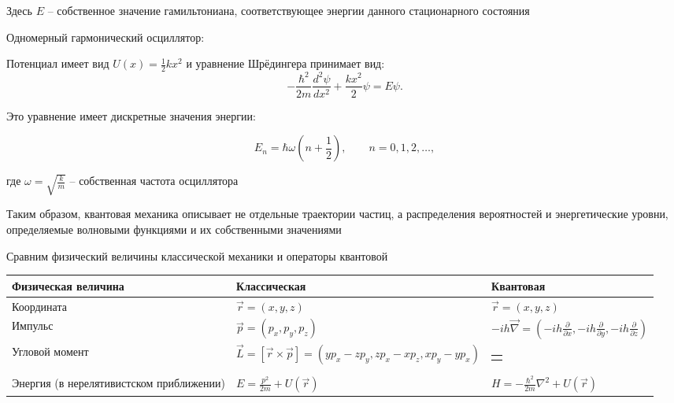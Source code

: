 \documentclass[12pt]{article}
\begin{document}
Здесь $E$ -- собственное значение гамильтониана, соответствующее энергии данного стационарного состояния

\mediumvspace

\Ex Одномерный гармонический осциллятор:

Потенциал имеет вид $U(x) = \frac{1}{2}kx^2$ и уравнение Шрёдингера принимает вид:
\[
-\frac{\hbar^2}{2m}\frac{d^2\psi}{dx^2} + \frac{kx^2}{2}\psi = E\psi.
\]

Это уравнение имеет дискретные значения энергии:

\[
E_n = \hbar\omega\left(n + \frac{1}{2}\right), \qquad n = 0, 1, 2, \ldots,
\]

где $\omega = \sqrt{\frac{k}{m}}$ -- собственная частота осциллятора

\mediumvspace

Таким образом, квантовая механика описывает не отдельные траектории частиц, а распределения вероятностей и энергетические уровни, определяемые волновыми функциями и их собственными значениями

Сравним физический величины классической механики и операторы квантовой
\begin{center}
    \begin{tabularx}{\textwidth}{p{}|X|X}
        Физическая величина & Классическая & Квантовая \\
        \hline
        Координата & $\vec r = (x, y, z)$ & $\vec r = (x, y, z)$ \\
        \hline
        Импульс & $\vec p = (p_x, p_y, p_z)$ & $-ih \vec \nabla = \left(-ih \frac{\partial}{\partial x}, -ih \frac{\partial}{\partial y}, -ih \frac{\partial}{\partial z}\right)$ \\
        \hline
        Угловой момент & $\vec L = [\vec r \times \vec p] = (y p_x - z p_y, z p_x - x p_z, x p_y - y p_x)$ & 
        \begin{tabular}{@{}c@{}}$
        \hat{\vec L} = -i\hbar [\vec r \times \vec{\nabla}] = \\[3pt]
        \biggl(
          -i\hbar\!\left(y \frac{\partial}{\partial z} - z \frac{\partial}{\partial y}\right), \\[3pt]
          -i\hbar\!\left(z \frac{\partial}{\partial x} - x \frac{\partial}{\partial z}\right), \\[3pt]
          -i\hbar\!\left(x \frac{\partial}{\partial y} - y \frac{\partial}{\partial x}\right)
        \biggr)
        $ \end{tabular}\\
        \hline
        Энергия (в нерелятивистском приближении) & $E = \frac{p^2}{2m} + U(\vec r)$ & $H = -\frac{\hbar^2}{2m} \nabla^2 + U(\vec r)$


    \end{tabularx}

\end{center}


\end{document}
